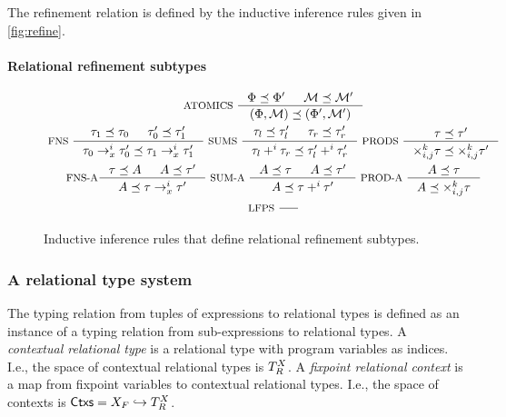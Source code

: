 The refinement relation is defined by the inductive inference rules
given in \autoref{fig:refine}.
%

\paragraph{Relational refinement subtypes}
%
\begin{figure}
  \centering
  \begin{gather*}
    \inference[ ATOMICS ]{
      \Phi \subtype \Phi' & \mathcal{M} \subtype \mathcal{M}' }{
      (\Phi, \mathcal{M}) \subtype (\Phi', \mathcal{M}') } \\
    \inference[ FNS ]{
      \tau_1 \subtype \tau_0 &
      \tau_0' \subtype \tau_1' }{
      \tau_0 \to_x^i \tau_0' \subtype \tau_1 \to_x^i \tau_1' } 
    \inference[ SUMS ]{
      \tau_l \subtype \tau_l' & \tau_r \subtype \tau_r' }{
      \tau_l +^i \tau_r \subtype \tau_l' +^i \tau_r' } 
    \inference[ PRODS ]{ \tau \subtype \tau'}{
      \times_{i, j}^k \tau \subtype \times_{i, j}^k \tau'} \\
    \inference[ FNS-A]{ \tau \subtype A & A \subtype \tau' }{
      A \subtype \tau \rightarrow_x^i \tau'} 
    \inference[ SUM-A ]{ A \subtype \tau & A \subtype \tau' }{
      A \subtype \tau +^i \tau' } 
    \inference[ PROD-A ]{ A \subtype \tau }{
      A \subtype \times^k_{i, j} \tau } \\
    \inference[ LFPS ]{}{} 
  \end{gather*}
  \caption{Inductive inference rules that define relational refinement
    subtypes.
  }
  \label{fig:subtypes}
\end{figure}



\subsubsection{A relational type system}
\label{sec:rel-type-sys}
%
The typing relation from tuples of expressions to relational types is
defined as an instance of a typing relation from sub-expressions to
relational types.
A \emph{contextual relational type} is a relational type with program
variables as indices.
%
I.e., the space of contextual relational types is $T_{R}^{X}$.
%
A \emph{fixpoint relational context} is a map from fixpoint variables
to contextual relational types.
%
I.e., the space of contexts is
$\mathsf{Ctxs} = X_F \hookrightarrow T_R^{X}$.

